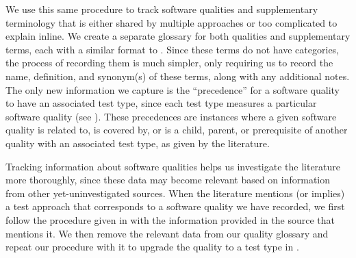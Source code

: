 \label{qual-supp-procedure}
We use this same procedure to track software qualities and supplementary
terminology that is either shared by multiple approaches or too complicated to
explain inline. We create a separate glossary for both qualities and
supplementary terms, each with a similar format to \ourApproachGlossary.
Since these terms do not have categories, the process of recording them is much
simpler, only requiring us to record the name, definition, and synonym(s) of
these terms, along with any additional notes. The only new information
we capture is the ``precedence'' for a software quality to have an associated
test type, since each test type measures a particular software quality (see
). These precedences are instances where a given software
quality is related to, is covered by, or is a child, parent, or prerequisite
of another quality with an associated test type, as given by the literature.

Tracking information about software qualities helps us investigate the
literature more thoroughly, since these data may become relevant based on
information from other yet-uninvestigated sources. When the literature mentions
(or implies) a test approach that corresponds to a software quality we have
recorded, we first follow the procedure given in 
with the information provided in the source that mentions it. We then remove
the relevant data from our quality glossary and repeat our procedure with it
to upgrade the quality to a test type in \ourApproachGlossary{}.%


